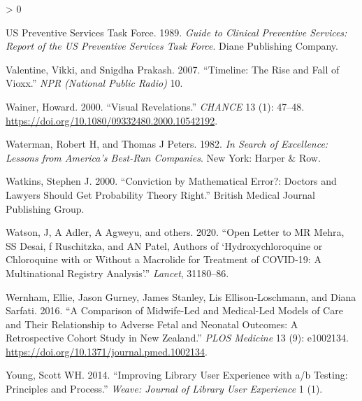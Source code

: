 \documentclass[
  10pt,
  b5paper]{book}
\newlength{\cslhangindent}
\newenvironment{CSLReferences}[2] %
 {%
  \setlength{\parindent}{0pt}
  \ifodd #1 \everypar{\setlength{\hangindent}{\cslhangindent}}\ignorespaces\fi
  \ifnum #2 > 0
  \setlength{\parskip}{#2\baselineskip}
  \fi
 }%
 {}
\begin{document}
\begin{CSLReferences}{1}{0}
\leavevmode\hypertarget{ref-us1989guide}{}%
US Preventive Services Task Force. 1989. \emph{Guide to Clinical Preventive Services: Report of the US Preventive Services Task Force}. Diane Publishing Company.

\leavevmode\hypertarget{ref-valentine2007timeline}{}%
Valentine, Vikki, and Snigdha Prakash. 2007. {``Timeline: The Rise and Fall of Vioxx.''} \emph{NPR (National Public Radio)} 10.

\leavevmode\hypertarget{ref-wainerRegress}{}%
Wainer, Howard. 2000. {``Visual Revelations.''} \emph{CHANCE} 13 (1): 47--48. \url{https://doi.org/10.1080/09332480.2000.10542192}.

\leavevmode\hypertarget{ref-waterman1982search}{}%
Waterman, Robert H, and Thomas J Peters. 1982. \emph{In Search of Excellence: Lessons from America's Best-Run Companies}. New York: Harper \& Row.

\leavevmode\hypertarget{ref-watkins2000conviction}{}%
Watkins, Stephen J. 2000. {``Conviction by Mathematical Error?: Doctors and Lawyers Should Get Probability Theory Right.''} British Medical Journal Publishing Group.

\leavevmode\hypertarget{ref-watson2020open}{}%
Watson, J, A Adler, A Agweyu, and others. 2020. {``Open Letter to MR Mehra, SS Desai, f Ruschitzka, and AN Patel, Authors of {`Hydroxychloroquine or Chloroquine with or Without a Macrolide for Treatment of COVID-19: A Multinational Registry Analysis'}.''} \emph{Lancet}, 31180--86.

\leavevmode\hypertarget{ref-wernham_EtAl_2016}{}%
Wernham, Ellie, Jason Gurney, James Stanley, Lis Ellison-Loschmann, and Diana Sarfati. 2016. {``A Comparison of Midwife-Led and Medical-Led Models of Care and Their Relationship to Adverse Fetal and Neonatal Outcomes: A Retrospective Cohort Study in New Zealand.''} \emph{PLOS Medicine} 13 (9): e1002134. \url{https://doi.org/10.1371/journal.pmed.1002134}.

\leavevmode\hypertarget{ref-young2014improving}{}%
Young, Scott WH. 2014. {``Improving Library User Experience with a/b Testing: Principles and Process.''} \emph{Weave: Journal of Library User Experience} 1 (1).

\end{CSLReferences}

\newpage
\end{document}
